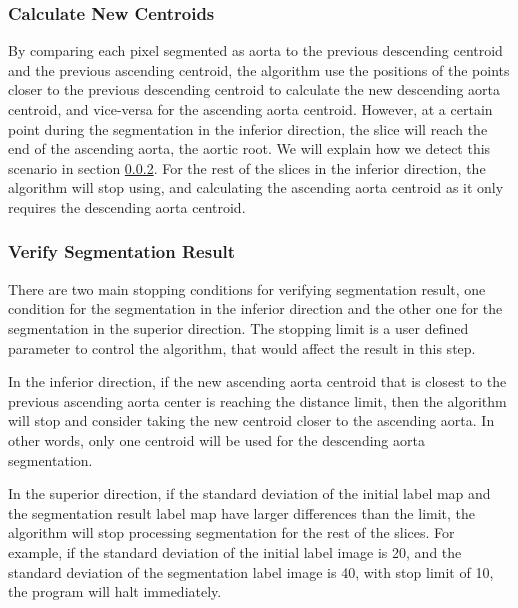 \subsubsection{Calculate New Centroids}
By comparing each pixel segmented as aorta to the previous descending centroid and the previous ascending centroid, the algorithm use the positions of the points closer to the previous descending centroid to calculate the new descending aorta centroid, and vice-versa for the ascending aorta centroid. However, at a certain point during the segmentation in the inferior direction, the slice will reach the end of the ascending aorta, the aortic root. We will explain how we detect this scenario in section \ref{stopping_condition}. For the rest of the slices in the inferior direction, the algorithm will stop using, and calculating the ascending aorta centroid as it only requires the descending aorta centroid.

\subsubsection{Verify Segmentation Result}\label{stopping_condition}
There are two main stopping conditions for verifying segmentation result, one condition for the segmentation in the inferior direction and the other one for the segmentation in the superior direction. The stopping limit is a user defined parameter to control the algorithm, that would affect the result in this step.

In the inferior direction, if the new ascending aorta centroid that is closest to the previous ascending aorta center is reaching the distance limit, then the algorithm will stop and consider taking the new centroid closer to the ascending aorta. In other words, only one centroid will be used for the descending aorta segmentation.

In the superior direction, if the standard deviation of the initial label map and the segmentation result label map have larger differences than the limit, the algorithm will stop processing segmentation for the rest of the slices. For example, if the standard deviation of the initial label image is 20, and the standard deviation of the segmentation label image is 40, with stop limit of 10, the program will halt immediately.

